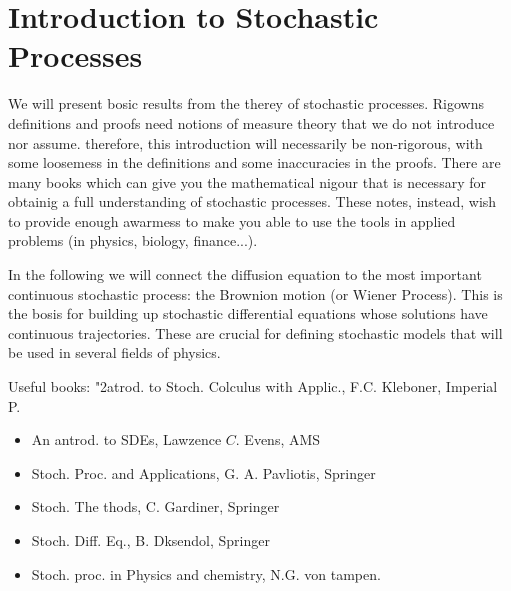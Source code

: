\section{Introduction to Stochastic Processes}
We will present bosic results from the therey of stochastic processes. Rigowns definitions and proofs need notions of measure theory that we do not introduce nor assume. therefore, this introduction will necessarily be non-rigorous, with some loosemess in the definitions and some inaccuracies in the proofs. There are many books which can give you the mathematical nigour that is necessary for obtainig a full understanding of stochastic processes. These notes, instead, wish to provide enough awarmess to make you able to use the tools in applied problems (in physics, biology, finance...).

In the following we will connect the diffusion equation to the most important continuous stochastic process: the Brownion motion (or Wiener Process). This is the bosis for building up stochastic differential equations whose solutions have continuous trajectories. These are crucial for defining stochastic models that will be used in several fields of physics.

Useful books: "2atrod. to Stoch. Colculus with Applic., F.C. Kleboner, Imperial P.

\begin{itemize}
  \item An antrod. to SDEs, Lawzence $C$. Evens, AMS
  \item Stoch. Proc. and Applications, G. A. Pavliotis, Springer
  \item Stoch. The thods, C. Gardiner, Springer
  \item Stoch. Diff. Eq., B. Dksendol, Springer
  \item Stoch. proc. in Physics and chemistry, N.G. von tampen.
\end{itemize}


